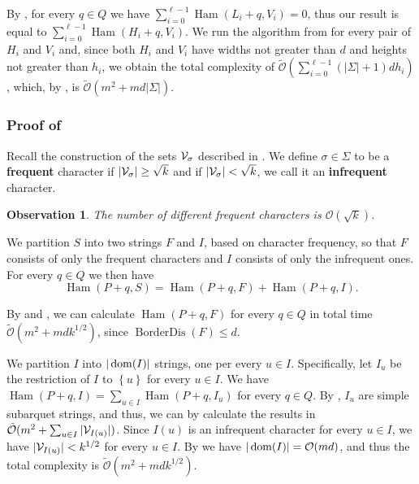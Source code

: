 \documentclass[11pt]{article}
\renewcommand{\O}{\mathcal{O}}
\newcommand{\tO}{\tilde{\mathcal{O}}}
\newcommand{\set}[1]{\left\lbrace #1 \right\rbrace}
\theoremstyle{plain}
\newtheorem{observation}{Observation}
\theoremstyle{definition}
\theoremstyle{remark}
\DeclareMathOperator*{\Ham}{Ham}
\DeclareMathOperator*{\BD}{BorderDis}
\begin{document}
By , for every $q \in Q$ we have $\sum_{i = 0}^{\ell - 1} \Ham(L_i + q, V_i) = 0$, thus our result is equal to $\sum_{i = 0}^{\ell - 1} \Ham(H_i + q, V_i)$.
We run the algorithm from  for every pair of $H_i$ and $V_i$ and, since both $H_i$ and $V_i$ have widths not greater than $d$ and heights not greater than $h_i$, we obtain the total complexity of $\tO(\sum_{i = 0}^{\ell - 1} (|\Sigma| + 1)dh_i)$, 
which, by , is $\tO(m^2 + md|\Sigma|)$.

\subsubsection{Proof of } \label{dense_algo_proof}

Recall the construction of the sets $\mathcal{V}_\sigma$ described in .
We define $\sigma \in \Sigma$ to be a \textbf{frequent} character if $|\mathcal{V}_\sigma| \ge \sqrt{k}$ and if $|\mathcal{V}_\sigma| < \sqrt{k}$, we call it an \textbf{infrequent} character.
\begin{observation}\label{frequent_character_bound}
	The number of different frequent characters is $\O(\sqrt{k})$.
\end{observation}


We partition $S$ into two strings $F$ and $I$, based on character frequency,
so that $F$ consists of only the frequent characters and $I$ consists of only the infrequent ones.
For every $q \in Q$ we then have 
$$\Ham(P + q, S) = \Ham(P + q, F) + \Ham(P + q, I).$$

By  and , we can calculate $\Ham(P + q, F)$ for every $q \in Q$ in total time $\tO(m^2 + mdk^{1/2})$, since $\BD(F) \le d$. 

We partition $I$ into $|\operatorname*{dom}(I)|$ strings, one per every $u \in I$.
Specifically, let $I_u$ be the restriction of $I$ to $\set{u}$ for every $u \in I$.
We have $\Ham(P + q, I) = \sum_{u \in I} \Ham(P + q, I_u)$ for every $q \in Q$.
By , $I_u$ are simple subarquet strings, and thus, we can by  calculate the results in $\tO(m^2 + \sum_{u \in I} |\V_{I(u)}|)$.
Since $I(u)$ is an infrequent character for every $u \in I$, we have $|\mathcal{V}_{I(u)}| < k^{1/2}$ for every $u \in I$.
By  we have $|\d{I}| = \O(md)$, and thus the total complexity is $\tO(m^2 + mdk^{1/2})$.

\end{document}
